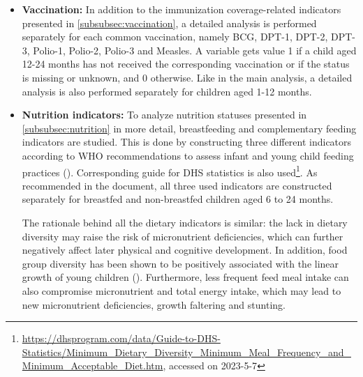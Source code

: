 \documentclass[12pt,a4paper,notitlepage]{article}
\begin{document}
\begin{itemize}
    \item \textbf{Vaccination:} In addition to the immunization coverage-related indicators presented in \cref{subsubsec:vaccination}, a detailed analysis is performed separately for each common vaccination, namely BCG, DPT-1, DPT-2, DPT-3, Polio-1, Polio-2, Polio-3 and Measles. A variable gets value 1 if a child aged 12-24 months has not received the corresponding vaccination or if the status is missing or unknown, and 0 otherwise. Like in the main analysis, a detailed analysis is also performed separately for children aged 1-12 months.

    \item \textbf{Nutrition indicators:} To analyze nutrition statuses presented in \cref{subsubsec:nutrition} in more detail, breastfeeding and complementary feeding indicators are studied. This is done by constructing three different indicators according to WHO recommendations to assess infant and young child feeding practices (\citet{who2021FoodIndicators}). Corresponding guide for DHS statistics is also used\footnote{\url{https://dhsprogram.com/data/Guide-to-DHS-Statistics/Minimum_Dietary_Diversity_Minimum_Meal_Frequency_and_Minimum_Acceptable_Diet.htm}, accessed on 2023-5-7}. As recommended in the document, all three used indicators are constructed separately for breastfed and non-breastfed children aged 6 to 24 months.

    The rationale behind all the dietary indicators is similar: the lack in dietary diversity may raise the risk of micronutrient deficiencies, which can further negatively affect later physical and cognitive development. In addition, food group diversity has been shown to be positively associated with the linear growth of young children (\citet{who2021FoodIndicators}). Furthermore, less frequent feed meal intake can also compromise micronutrient and total energy intake, which may lead to new micronutrient deficiencies, growth faltering and stunting.


\end{itemize}
\end{document}
